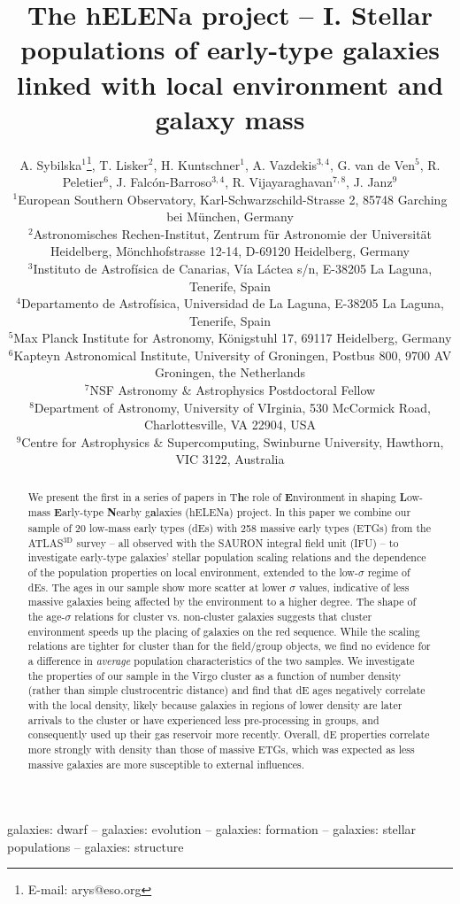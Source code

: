 \documentclass[useAMS,usenatbib]{mn2e}
\title[The hELENa project - I.]{The hELENa project -- I. Stellar populations of early-type galaxies linked with local environment and galaxy mass}
\author[Agnieszka Sybilska et al.]{A. Sybilska$^{1}$\thanks{E-mail: arys@eso.org}, T. Lisker$^{2}$, H. Kuntschner$^{1}$, A. Vazdekis$^{3,4}$, G. van de Ven$^{5}$, \newauthor R. Peletier$^{6}$,  J. Falc\'{o}n-Barroso$^{3,4}$, R. Vijayaraghavan$^{7,8}$, J. Janz$^{9}$\\ 
$^{1}$European Southern Observatory, Karl-Schwarzschild-Strasse 2, 85748 Garching bei M\"{u}nchen, Germany\\
$^{2}$Astronomisches Rechen-Institut, Zentrum f\"{u}r Astronomie der Universit\"{a}t Heidelberg, M\"{o}nchhofstrasse 12-14, D-69120 Heidelberg, Germany\\
$^{3}$Instituto de Astrof\'isica de Canarias, V\'ia L\'actea s/n, E-38205 La Laguna, Tenerife, Spain\\
$^{4}$Departamento de Astrof\'isica, Universidad de La Laguna, E-38205 La Laguna, Tenerife, Spain\\
$^{5}$Max Planck Institute for Astronomy, K\"{o}nigstuhl 17, 69117 Heidelberg, Germany\\
$^{6}$Kapteyn Astronomical Institute, University of Groningen, Postbus 800, 9700 AV Groningen, the Netherlands\\
$^{7}$NSF Astronomy \& Astrophysics Postdoctoral Fellow\\
$^{8}$Department of Astronomy, University of VIrginia, 530 McCormick Road, Charlottesville, VA 22904, USA\\
$^{9}$Centre for Astrophysics \& Supercomputing, Swinburne University, Hawthorn, VIC 3122, Australia
}
\newcommand{\sig}{$\sigma$}
\newcommand{\atlas}{ATLAS$^{\mathrm{3D}}$}
\begin{document}
\date{}


\maketitle

\label{firstpage}

\begin{abstract}
We present the first in a series of papers in T\textbf{h}e role of \textbf{E}nvironment in shaping \textbf{L}ow-mass \textbf{E}arly-type \textbf{N}earby g\textbf{a}laxies (hELENa) project. In this paper we combine our sample of 20 low-mass early types (dEs) with 258 massive early types (ETGs) from the {\atlas} survey -- all observed with the SAURON integral field unit (IFU) -- to investigate early-type galaxies' stellar population scaling relations and the dependence of the population properties on local environment, extended to the low-{\sig} regime of dEs. The ages in our sample show more scatter at lower {\sig} values, indicative of less massive galaxies being affected by the environment to a higher degree. The shape of the age-{\sig} relations for cluster vs. non-cluster galaxies suggests that cluster environment speeds up the placing of galaxies on the red sequence. While the scaling relations are tighter for cluster than for the field/group objects, we find no evidence for a difference in \textit{average} population characteristics of the two samples. We investigate the properties of our sample in the Virgo cluster as a function of number density (rather than simple clustrocentric distance) and find that dE ages negatively correlate with the local density, likely because galaxies in regions of lower density are later arrivals to the cluster or have experienced less pre-processing in groups, and consequently used up their gas reservoir more recently. Overall, dE properties correlate more strongly with density than those of massive ETGs, which was expected as less massive galaxies are more susceptible to external influences. 
\end{abstract}

\begin{keywords}
galaxies: dwarf -- galaxies: evolution -- galaxies: formation -- galaxies: stellar populations -- galaxies: structure
\end{keywords}
\end{document}
